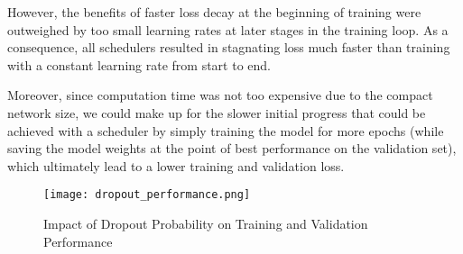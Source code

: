 However, the benefits of faster loss decay at the beginning of training were outweighed by too small learning rates at later stages in the training loop.
As a consequence, all schedulers resulted in stagnating loss much faster than training with a constant learning rate from start to end.

Moreover, since computation time was not too expensive due to the compact network size, we could make up for the slower initial progress that could be achieved with a scheduler by simply training the model for more epochs (while saving the model weights at the point of best performance on the validation set), which ultimately lead to a lower training and validation loss.

\begin{figure}[ht]
    \centering
    \texttt{[image: dropout\_performance.png]}
    \caption{Impact of Dropout Probability on Training and Validation Performance}
    \label{fig:dropout}
\end{figure}
